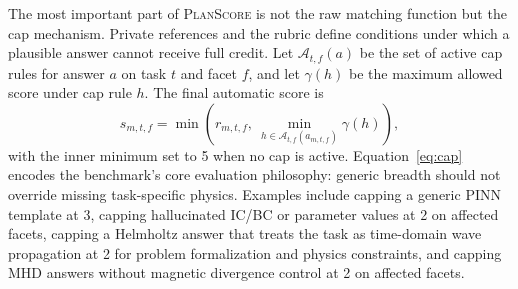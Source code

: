 \documentclass[11pt]{article}
\newcommand{\planscore}{\textsc{PlanScore}}
\begin{document}
The most important part of \planscore{} is not the raw matching function but the cap mechanism. Private references and the rubric define conditions under which a plausible answer cannot receive full credit. Let $\mathcal{A}_{t,f}(a)$ be the set of active cap rules for answer $a$ on task $t$ and facet $f$, and let $\gamma(h)$ be the maximum allowed score under cap rule $h$. The final automatic score is
\begin{equation}
s_{m,t,f} =
\min\left(r_{m,t,f},\ \min_{h \in \mathcal{A}_{t,f}(a_{m,t,f})} \gamma(h)\right),
\label{eq:cap}
\end{equation}
with the inner minimum set to 5 when no cap is active. Equation~\ref{eq:cap} encodes the benchmark's core evaluation philosophy: generic breadth should not override missing task-specific physics. Examples include capping a generic PINN template at 3, capping hallucinated IC/BC or parameter values at 2 on affected facets, capping a Helmholtz answer that treats the task as time-domain wave propagation at 2 for problem formalization and physics constraints, and capping MHD answers without magnetic divergence control at 2 on affected facets.
\end{document}
